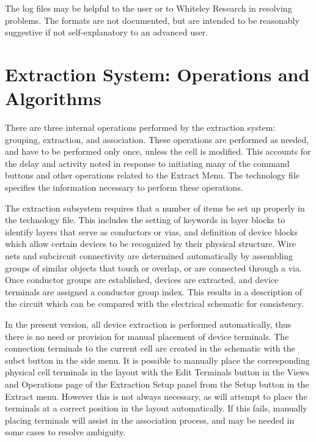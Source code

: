 The log files may be helpful to the user or to Whiteley Research in
resolving problems.  The formats are not documented, but are intended
to be reasonably suggestive if not self-explanatory to an advanced
user.


\section{Extraction System: Operations and Algorithms}

There are three internal operations performed by the extraction
system:  grouping, extraction, and association.  These operations are
performed as needed, and have to be performed only once, unless the
cell is modified.  This accounts for the delay and activity noted in
response to initiating many of the command buttons and other
operations related to the {\cb Extract Menu}.  The technology file
specifies the information necessary to perform these operations.

The extraction subsystem requires that a number of items be set up
properly in the technology file.  This includes the setting of
keywords in layer blocks to identify layers that serve as conductors
or vias, and definition of device blocks which allow certain devices
to be recognized by their physical structure.  Wire nets and
subcircuit connectivity are determined automatically by assembling
groups of similar objects that touch or overlap, or are connected
through a via.  Once conductor groups are established, devices are
extracted, and device terminals are assigned a conductor group index. 
This results in a description of the circuit which can be compared
with the electrical schematic for consistency.

In the present version, all device extraction is performed
automatically, thus there is no need or provision for manual placement
of device terminals.  The connection terminals to the current cell are
created in the schematic with the {\cb subct} button in the side menu. 
It is possible to manually place the corresponding physical cell
terminals in the layout with the {\cb Edit Terminals} button in the
{\cb Views and Operations} page of the {\cb Extraction Setup} panel
from the {\cb Setup} button in the {\cb Extract menu}.  However this
is not always necessary, as {\Xic} will attempt to place the terminals
at a correct position in the layout automatically.  If this fails,
manually placing terminals will assist in the association process, and
may be needed in some cases to resolve ambiguity.


